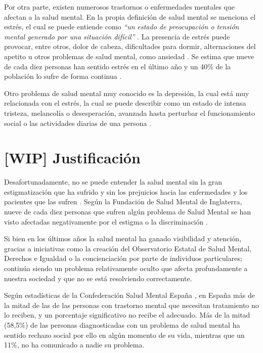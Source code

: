 Por otra parte, existen numerosos trastornos o enfermedades mentales que afectan a la salud mental. En la propia definición de salud mental se menciona el estrés, el cual se puede entiende como  \textit{``un estado de preocupación o tensión mental generado por una situación difícil''}  \cite{oms_estres_2023}. La presencia de estrés puede provocar, entre otros, dolor de cabeza, dificultades para dormir, alternaciones del apetito u otros problemas de salud mental, como ansiedad \cite{oms_estres_2023}. Se estima que nueve de cada diez personas han sentido estrés en el último año y un 40\% de la población lo sufre de forma continua \cite{nogera_mas_estres_2024}.

Otro problema de salud mental muy conocido es la depresión, la cual está muy relacionada con el estrés, la cual se puede describir como un estado de intensa tristeza, melancolía o desesperación, avanzada hasta perturbar el funcionamiento social o las actividades diarias de una persona \cite{van_neerven_rarrxr_2008}. 



\section{[WIP] Justificación}
    
    Desafortunadamente, no se puede entender la salud mental sin la gran estigmatización que ha sufrido y sin los prejuicios hacia las enfermedades y los pacientes que las sufren \cite{delgado_rompiendo_2021} \cite{andres_tallarda_combatir_2020}. Según la Fundación de Salud Mental de Inglaterra, nueve de cada diez personas que sufren algún problema de Salud Mental se han visto afectadas negativamente por el estigma o la discriminación \cite{mental_health_foundation_stigma_nodate}.

    Si bien en los últimos años la salud mental ha ganado visibilidad y atención, gracias a iniciativas como la creación del Observatorio Estatal de Salud Mental, Derechos e Igualdad \cite{comunicacion_nace_2022} o la concienciación por parte de individuos particulares; continúa siendo un problema relativamente oculto que afecta profundamente a nuestra sociedad y que no se está resolviendo correctamente. 
    
    Según estadísticas de la Confederación Salud Mental España \cite{confederacion_salud_mental_espana_salud_nodate} \cite{aguilar_laura_2022}, en España más de la mitad de las de las personas con trastorno mental que necesitan tratamiento no lo reciben, y un porcentaje significativo no recibe el adecuado. Más de la mitad (58,5\%) de las personas diagnosticadas con un problema de salud mental ha sentido rechazo social por ello en algún momento de su vida, mientras que un 11\%, no ha comunicado a nadie su problema.
    

